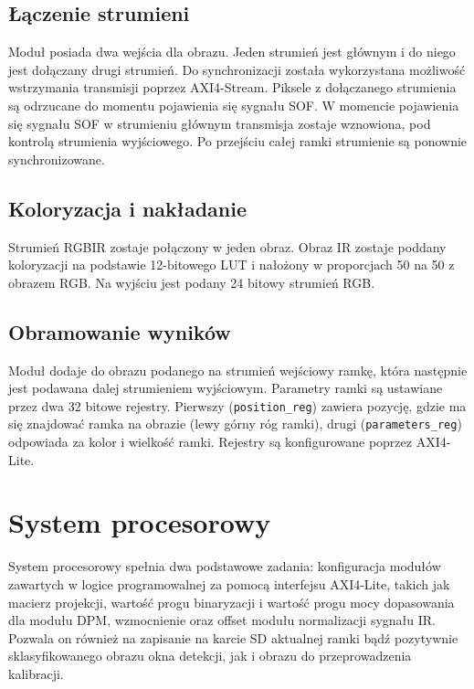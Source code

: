 \subsection{Łączenie strumieni}

Moduł posiada dwa wejścia dla obrazu. 
Jeden strumień jest głównym i do niego jest dołączany drugi strumień. %
Do synchronizacji została wykorzystana możliwość wstrzymania transmisji poprzez AXI4-Stream. 
Piksele z dołączanego strumienia są odrzucane do momentu pojawienia się sygnału SOF.
W momencie pojawienia się sygnału SOF w strumieniu głównym transmisja zostaje wznowiona, pod kontrolą strumienia wyjściowego. %
Po przejściu całej ramki strumienie są ponownie synchronizowane.  

\subsection{Koloryzacja i nakładanie}

Strumień RGBIR zostaje połączony w jeden obraz. 
Obraz IR zostaje poddany koloryzacji na podstawie 12-bitowego LUT i nałożony w proporcjach 50 na 50 z obrazem RGB. 
Na wyjściu jest podany 24 bitowy strumień RGB.


\subsection{Obramowanie wyników}

Moduł dodaje do obrazu podanego na strumień wejściowy ramkę, która następnie jest podawana dalej strumieniem wyjściowym. %
Parametry ramki są ustawiane przez dwa 32 bitowe rejestry. 
Pierwszy  (\texttt{position\_reg}) zawiera pozycję, gdzie ma się znajdować ramka na obrazie (lewy górny róg ramki), drugi (\texttt{parameters\_reg}) odpowiada za kolor i wielkość ramki. 
Rejestry są konfigurowane poprzez AXI4-Lite.


\section{System procesorowy}

System procesorowy spełnia dwa podstawowe zadania: konfiguracja modułów zawartych w logice programowalnej za pomocą interfejsu AXI4-Lite, takich jak macierz projekcji, wartość progu binaryzacji i wartość progu mocy dopasowania dla modułu DPM, wzmocnienie oraz offset modułu normalizacji sygnału IR. %
Pozwala on również na zapisanie na karcie SD aktualnej ramki bądź pozytywnie sklasyfikowanego obrazu okna detekcji, jak i obrazu do przeprowadzenia kalibracji.

